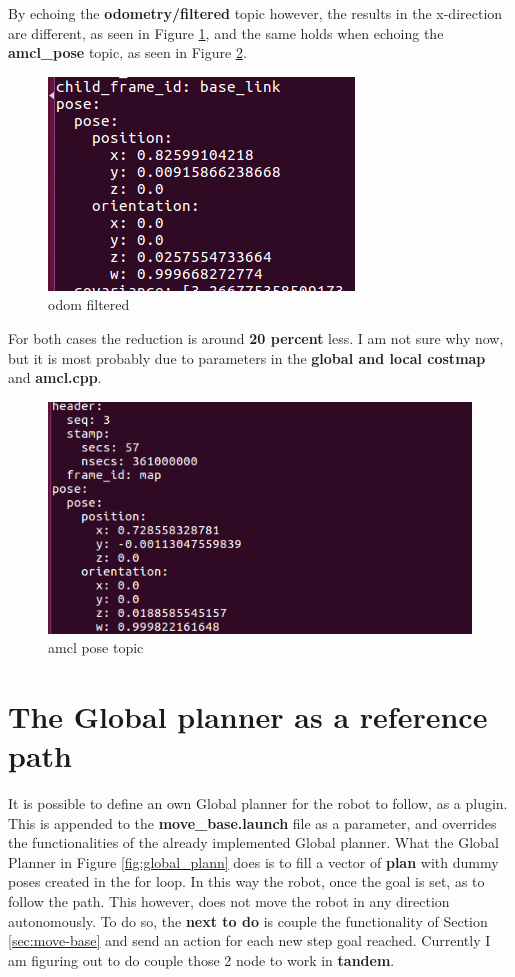 \documentclass[11pt,a4paper]{article}
\begin{document}
\vline

By echoing the \textbf{odometry/filtered} topic however, the results in the x-direction are different, as seen in Figure \ref{fig:odom_filt}, and the same holds when echoing the \textbf{amcl{\_}pose} topic, as seen in Figure \ref{fig:amcl_pose}. 

\begin{figure}[!htb]
	\center
	\includegraphics[width=.4\textwidth]{figures/odom_filtered.png}
	\caption{odom filtered}
	\label{fig:odom_filt}
\end{figure}

For both cases the reduction is around \textbf{20 percent} less. I am not sure why now, but it is most probably due to parameters in the \textbf{global and local costmap} and \textbf{amcl.cpp}.

\begin{figure}[!htb]
	\center
	\includegraphics[width=.6\textwidth]{figures/amcl_pose.png}
	\caption{amcl pose topic}
	\label{fig:amcl_pose}
\end{figure}


\section{The Global planner as a reference path} \label{sec:global_planner}

It is possible to define an own Global planner for the robot to follow, as a plugin. This is appended to the \textbf{move{\_}base.launch} file as a parameter, and overrides the functionalities of the already implemented Global planner. What the Global Planner in Figure \ref{fig:global_plann} does is to fill a vector of \textbf{plan} with dummy poses created in the for loop. In this way the robot, once the goal is set, as to follow the path. This however, does not move the robot in any direction autonomously. To do so, the \textbf{next to do} is couple the functionality of Section \ref{sec:move-base} and send an action for each new step goal reached. Currently I am figuring out to do couple those 2 node to work in \textbf{tandem}. 
\end{document}
